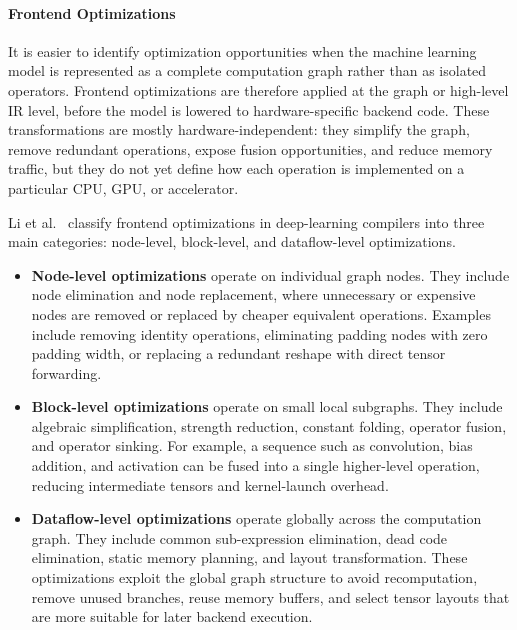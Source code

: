 \documentclass[12pt,a4paper]{report}
\begin{document}
\paragraph{Frontend Optimizations}
It is easier to identify optimization opportunities when the machine learning model is represented
as a complete computation graph rather than as isolated operators. Frontend optimizations are
therefore applied at the graph or high-level IR level, before the model is lowered to hardware-specific
backend code. These transformations are mostly hardware-independent: they simplify the graph,
remove redundant operations, expose fusion opportunities, and reduce memory traffic, but they do
not yet define how each operation is implemented on a particular CPU, GPU, or accelerator.

Li et al.~\cite{li2020deep} classify frontend optimizations in deep-learning compilers into three
main categories: node-level, block-level, and dataflow-level optimizations.

\begin{itemize}
    \item \textbf{Node-level optimizations} operate on individual graph nodes. They include
    node elimination and node replacement, where unnecessary or expensive nodes are removed
    or replaced by cheaper equivalent operations. Examples include removing identity operations,
    eliminating padding nodes with zero padding width, or replacing a redundant reshape with
    direct tensor forwarding.

    \item \textbf{Block-level optimizations} operate on small local subgraphs. They include
    algebraic simplification, strength reduction, constant folding, operator fusion, and operator
    sinking. For example, a sequence such as convolution, bias addition, and activation can be
    fused into a single higher-level operation, reducing intermediate tensors and kernel-launch
    overhead.

    \item \textbf{Dataflow-level optimizations} operate globally across the computation graph.
    They include common sub-expression elimination, dead code elimination, static memory
    planning, and layout transformation. These optimizations exploit the global graph structure
    to avoid recomputation, remove unused branches, reuse memory buffers, and select tensor
    layouts that are more suitable for later backend execution.
\end{itemize}
\end{document}
